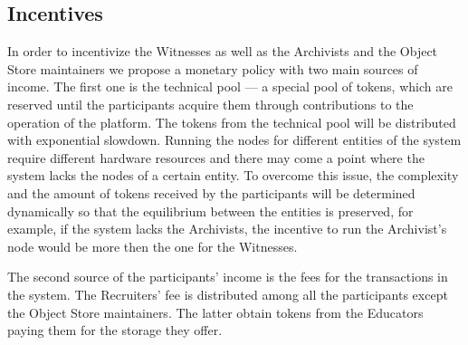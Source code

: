 \subsection{Incentives}

In order to incentivize the Witnesses as well as the Archivists and the Object Store maintainers we propose a monetary policy with two main sources of income. The first one is the technical pool — a special pool of tokens, which are reserved until the participants acquire them through contributions to the operation of the platform. The tokens from the technical pool will be distributed with exponential slowdown. Running the nodes for different entities of the system require different hardware resources and there may come a point where the system lacks the nodes of a certain entity. To overcome this issue, the complexity and the amount of tokens received by the participants will be determined dynamically so that the equilibrium between the entities is preserved, for example, if the system lacks the Archivists, the incentive to run the Archivist's node would be more then the one for the Witnesses.

The second source of the participants' income is the fees for the transactions in the system. The Recruiters' fee is distributed among all the participants except the Object Store maintainers. The latter obtain tokens from the Educators paying them for the storage they offer.
